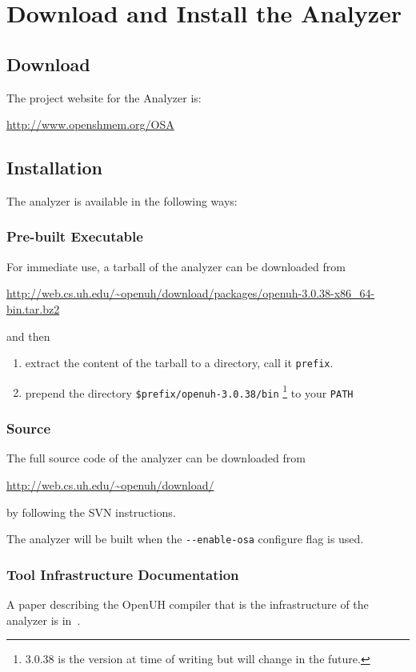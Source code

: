 \section{Download and Install the \openshmem Analyzer}
\label{chapter:download}

\subsection{Download}

The project website for the \openshmem Analyzer is:

\begin{center}
{\small \url{http://www.openshmem.org/OSA}}
\end{center}

\subsection{Installation}


The \openshmem analyzer is available in the following ways:

\subsubsection{Pre-built Executable}

For immediate use, a tarball of the \openshmem analyzer can be
downloaded from

\begin{center}
{\small \url{http://web.cs.uh.edu/~openuh/download/packages/openuh-3.0.38-x86_64-bin.tar.bz2}}
\end{center}

and then

\begin{enumerate}
\item extract the content of the tarball to a directory, call it
  \texttt{prefix}.
\item prepend the directory \texttt{\$prefix/openuh-3.0.38/bin}
  \footnote{3.0.38 is the version at time of writing but will change
    in the future.} to your \texttt{PATH}
\end{enumerate}


\subsubsection{Source}

The full source code of the \openshmem analyzer can be downloaded from
\begin{center}
{\small \url{http://web.cs.uh.edu/~openuh/download/}}
\end{center}
by following the SVN instructions.

The \openshmem analyzer will be built when the
\texttt{-{}-{}enable-osa} configure flag is used.

\subsubsection{Tool Infrastructure Documentation}

A paper describing the OpenUH compiler that is the infrastructure of
the \openshmem analyzer is in~\cite{chapman2012experiencesspringer}.
